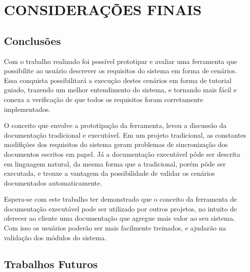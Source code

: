 \chapter{CONSIDERAÇÕES FINAIS}

\section{Conclusões}

Com o trabalho realizado foi possível prototipar e avaliar uma ferramenta que possibilite ao usuário descrever os requisitos do sistema em forma de cenários. Essa conquista possibilitará a execução destes cenários em forma de tutorial guiado, trazendo um melhor entendimento do sistema, e tornando mais fácil e conexa a verificação de que todos os requisitos foram corretamente implementados.

O conceito que envolve a prototipação da ferramenta, levou a discussão da documentação tradicional e executável. Em um projeto tradicional, as constantes modifições dos requisitos do sistema geram problemas de sincronização dos documentos escritos em papel. Já a documentação executável pôde ser descrita em linguagem natural, da mesma forma que a tradicional, porém pôde ser executada, e trouxe a vantagem da possibilidade de validar os cenários documentados automaticamente.

Espera-se com este trabalho ter demonstrado que o conceito da ferramenta de documentação executável pode ser utilizado por outros projetos, no intuito de oferecer ao cliente uma documentação que agregue mais valor ao seu sistema. Com isso os usuários poderão ser mais facilmente treinados, e ajudarão na validação dos módulos do sistema.

\section{Trabalhos Futuros}
